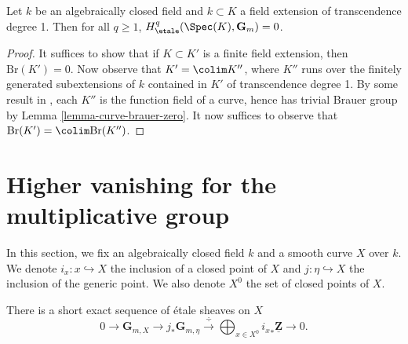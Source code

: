 \begin{lemma}
\label{lemma-cohomology-Gm-function-field-curve}
Let $k$ be an algebraically closed field and $k \subset K$ a field extension
of transcendence degree 1. Then for all $q \geq 1$,
$H_\etale^q(\Spec(K), \mathbf{G}_m) = 0$.
\end{lemma}

\begin{proof}
It suffices to show that if $K \subset K'$ is a finite field extension, then
$\text{Br}(K') = 0$. Now observe that $K' = \colim K''$, where $K''$ runs
over the finitely generated subextensions of $k$ contained in $K'$ of
transcendence degree 1. By some result in \cite{H}, each $K''$ is the function
field of a curve, hence has trivial Brauer group by
Lemma \ref{lemma-curve-brauer-zero}.
It now suffices to observe that $\text{Br}(K') = \colim \text{Br}(K'')$.
\end{proof}






\section{Higher vanishing for the multiplicative group}
\label{section-higher-Gm}

\noindent
In this section, we fix an algebraically closed field $k$ and a smooth curve
$X$ over $k$. We denote $i_x : x \hookrightarrow X$ the inclusion of a closed
point of $X$ and $j : \eta \hookrightarrow X$ the inclusion of the generic
point. We also denote $X^0$ the set of closed points of $X$.

\begin{theorem}
\label{theorem-fundamental-exact-sequence}
There is a short exact sequence of \'etale sheaves on $X$
$$
0 \longrightarrow \mathbf{G}_{m, X} \longrightarrow j_* \mathbf{G}_{m, \eta}
\xrightarrow{\ \div\ } \bigoplus_{x \in X^0} {i_x}_* \underline{\mathbf{Z}}
\longrightarrow 0.
$$
\end{theorem}

